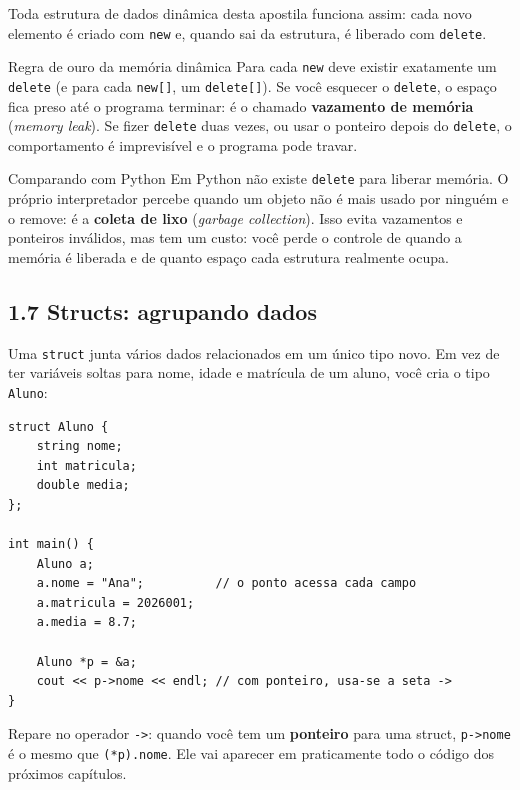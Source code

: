 Toda estrutura de dados dinâmica desta apostila funciona assim: cada novo elemento é criado com \texttt{new} e, quando sai da estrutura, é liberado com \texttt{delete}.

\begin{destaque}{Regra de ouro da memória dinâmica}
Para cada \texttt{new} deve existir exatamente um \texttt{delete} (e para cada \texttt{new[]}, um \texttt{delete[]}). Se você esquecer o \texttt{delete}, o espaço fica preso até o programa terminar: é o chamado \textbf{vazamento de memória} (\textit{memory leak}). Se fizer \texttt{delete} duas vezes, ou usar o ponteiro depois do \texttt{delete}, o comportamento é imprevisível e o programa pode travar.
\end{destaque}

\begin{destaque}{Comparando com Python}
Em Python não existe \texttt{delete} para liberar memória. O próprio interpretador percebe quando um objeto não é mais usado por ninguém e o remove: é a \textbf{coleta de lixo} (\textit{garbage collection}). Isso evita vazamentos e ponteiros inválidos, mas tem um custo: você perde o controle de quando a memória é liberada e de quanto espaço cada estrutura realmente ocupa.
\end{destaque}

\subsection{1.7 Structs: agrupando dados}

Uma \texttt{struct} junta vários dados relacionados em um único tipo novo. Em vez de ter variáveis soltas para nome, idade e matrícula de um aluno, você cria o tipo \texttt{Aluno}:

\begin{codigo}
\begin{Verbatim}[breaklines=true, breaksymbolleft={}, fontsize=\footnotesize]
struct Aluno {
    string nome;
    int matricula;
    double media;
};

int main() {
    Aluno a;
    a.nome = "Ana";          // o ponto acessa cada campo
    a.matricula = 2026001;
    a.media = 8.7;

    Aluno *p = &a;
    cout << p->nome << endl; // com ponteiro, usa-se a seta ->
}
\end{Verbatim}
\end{codigo}

Repare no operador \texttt{->}: quando você tem um \textbf{ponteiro} para uma struct, \texttt{p->nome} é o mesmo que \texttt{(*p).nome}. Ele vai aparecer em praticamente todo o código dos próximos capítulos.

